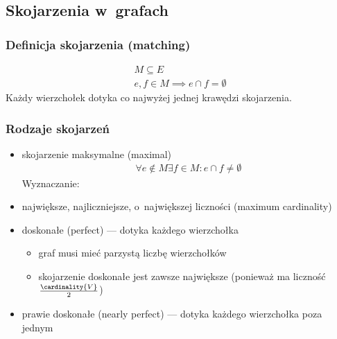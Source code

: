 \subsection*{Skojarzenia w~grafach}
\subsubsection*{Definicja skojarzenia (matching)}
\begin{gather*}
    M \subseteq E\\
    e, f \in M \implies e \cap f = \emptyset
\end{gather*}
Każdy wierzchołek dotyka co najwyżej jednej krawędzi skojarzenia.
\subsubsection*{Rodzaje skojarzeń}
\begin{itemize}
    \item skojarzenie maksymalne (maximal)
        \begin{gather*}
            \forall e \not\in M \exists f \in M\colon e \cap f \neq \emptyset
        \end{gather*}
        Wyznaczanie:
    \item największe, najliczniejsze, o~największej liczności (maximum cardinality)
    \item doskonałe (perfect) --- dotyka każdego wierzchołka
        \begin{itemize}
            \item graf musi mieć parzystą liczbę wierzchołków
            \item skojarzenie doskonałe jest zawsze największe (ponieważ ma liczność \(\frac{\cardinality{V}}{2}\))
        \end{itemize}
    \item prawie doskonałe (nearly perfect) --- dotyka każdego wierzchołka poza jednym
\end{itemize}

